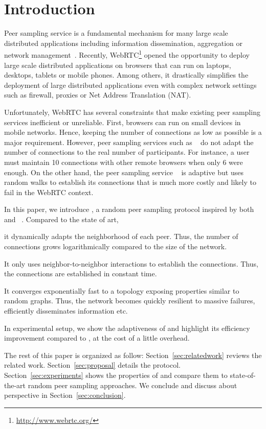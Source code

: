 
\section{Introduction}

Peer sampling service is a fundamental mechanism for many large scale
distributed applications including information dissemination, aggregation or
network management~\cite{jelasity2007gossip}. Recently,
WebRTC\footnote{\url{http://www.webrtc.org/}} opened the opportunity to deploy
large scale distributed applications on browsers that can run on laptops,
desktops, tablets or mobile phones. Among others, it drastically simplifies the
deployment of large distributed applications even with complex network settings
such as firewall, proxies or Net Address Translation (NAT).

Unfortunately, WebRTC has several constraints that make existing peer
sampling services inefficient or unreliable. First, browsers can run
on small devices in mobile networks. Hence, keeping the number of
connections as low as possible is a major requirement. However, peer
sampling services such as \CYCLON~\cite{voulgaris2005cyclon} do not
adapt the number of connections to the real number of
participants. For instance, a user must maintain 10 connections with
other remote browsers when only 6 were enough. On the other hand, the
peer sampling service \SCAMP~\cite{ganesh2003peer} is adaptive but
uses random walks to establish its connections that is much more
costly and likely to fail in the WebRTC context.

In this paper, we introduce \SPRAY, a random peer sampling protocol inspired
by both \CYCLON~\cite{voulgaris2005cyclon} and
\SCAMP~\cite{ganesh2003peer}. Compared to the state of art,
\begin{inparaenum}[(i)]
\item it dynamically adapts the neighborhood of each peer. Thus, the number of
  connections grows logarithmically compared to the size of the network.
\item It only uses neighbor-to-neighbor interactions to establish the
  connections. Thus, the connections are established in constant time.
\item It converges exponentially fast to a topology exposing properties similar
  to random graphs. Thus, the network becomes quickly resilient to massive
  failures, efficiently disseminates information etc.
\item In experimental setup, we show the adaptiveness of \SPRAY and
  highlight its efficiency improvement compared to \CYCLON, at the cost of a
  little overhead.
\end{inparaenum}

The rest of this paper is organized as follow: Section~\ref{sec:relatedwork}
reviews the related work. Section~\ref{sec:proposal} details the \SPRAY
protocol.  Section~\ref{sec:experiments} shows the properties of \SPRAY
and compare them to state-of-the-art random peer sampling approaches. We
conclude and discuss about perspective in Section~\ref{sec:conclusion}.

